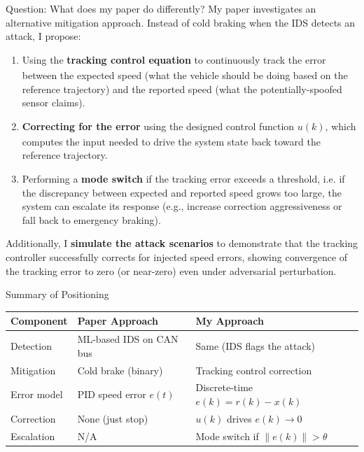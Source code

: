 \begin{questionbox}{Question: What does my paper do differently?}
	My paper investigates an alternative mitigation approach.
	Instead of cold braking when the IDS detects an attack, I propose:
	
	\begin{enumerate}[label=(\alph*)]
		\item Using the \textbf{tracking control equation}\textsubscript{\cite{tymoshchuk2024tracking}} to continuously track the error between the expected speed (what the vehicle should be doing based on the reference trajectory) and the reported speed (what the potentially-spoofed sensor claims).
		      
		\item \textbf{Correcting for the error} using the designed control function $u(k)$\textsubscript{\cite{tymoshchuk2024tracking}},
		      which computes the input needed to drive the system state back toward the reference trajectory.
		      
		\item Performing a \textbf{mode switch} if the tracking error exceeds a threshold,
		      i.e. if the discrepancy between expected and reported speed grows too large,
		      the system can escalate its response (e.g., increase correction aggressiveness
		      or fall back to emergency braking).
	\end{enumerate}
	
	Additionally, I \textbf{simulate the attack scenarios} to demonstrate that the tracking controller successfully corrects for injected speed errors, showing convergence of the tracking error to zero (or near-zero) even under adversarial perturbation.
\end{questionbox}

\begin{contextbox}{Summary of Positioning}
	\begin{center}
		\renewcommand{\arraystretch}{1.4}
		\begin{tabular}{|l|l|l|}
			\hline
			\textbf{Component} & \textbf{Paper \cite{jedh2023improvement} Approach} & \textbf{My Approach}               \\
			\hline
			Detection          & ML-based IDS on CAN bus                            & Same (IDS flags the attack)        \\
			\hline
			Mitigation         & Cold brake (binary)                                & Tracking control correction        \\
			\hline
			Error model        & PID speed error $e(t)$                             & Discrete-time $e(k) = r(k) - x(k)$ \\
			\hline
			Correction         & None (just stop)                                   & $u(k)$ drives $e(k) \to 0$         \\
			\hline
			Escalation         & N/A                                                & Mode switch if $\|e(k)\| > \theta$ \\
			\hline
		\end{tabular}
	\end{center}
\end{contextbox}




